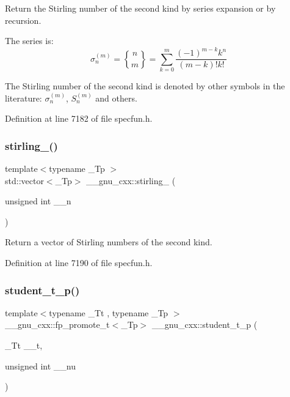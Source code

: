 Return the Stirling number of the second kind by series expansion or by recursion.

The series is\+: \[ \sigma_n^{(m)} = \genfrac{\{}{\}}{0pt}{0}{n}{m} = \sum_{k=0}^{m}\frac{(-1)^{m-k}k^n}{(m-k)!k!} \]

The Stirling number of the second kind is denoted by other symbols in the literature\+: $ \sigma_n^{(m)} $, $ \textit{S}_n^{(m)} $ and others. 

Definition at line 7182 of file specfun.\+h.

\mbox{\label{group__mathsf__gnu_ga6a2386b3e0940935f10a163baa925656}} 
\subsubsection{\texorpdfstring{stirling\+\_()}{stirling\_2()}\hspace{0.1cm}{\footnotesize\ttfamily [2/2]}}
{\footnotesize\ttfamily template$<$typename \+\_\+\+Tp $>$ \\
std\+::vector$<$\+\_\+\+Tp$>$ \+\_\+\+\_\+gnu\+\_\+cxx\+::stirling\+\_ (\begin{DoxyParamCaption}\item[{unsigned int}]{\+\_\+\+\_\+n }\end{DoxyParamCaption})\hspace{0.3cm}{\ttfamily [inline]}}

Return a vector of Stirling numbers of the second kind. 

Definition at line 7190 of file specfun.\+h.

\mbox{\label{group__mathsf__gnu_ga5a84386b009ac57a726d5d0314fdf7ce}} 
\subsubsection{\texorpdfstring{student\+\_\+t\+\_\+p()}{student\_t\_p()}}
{\footnotesize\ttfamily template$<$typename \+\_\+\+Tt , typename \+\_\+\+Tp $>$ \\
\+\_\+\+\_\+gnu\+\_\+cxx\+::fp\+\_\+promote\+\_\+t$<$\+\_\+\+Tp$>$ \+\_\+\+\_\+gnu\+\_\+cxx\+::student\+\_\+t\+\_\+p (\begin{DoxyParamCaption}\item[{\+\_\+\+Tt}]{\+\_\+\+\_\+t,  }\item[{unsigned int}]{\+\_\+\+\_\+nu }\end{DoxyParamCaption})}



